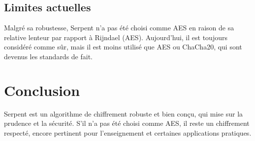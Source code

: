 \documentclass[12pt,a4paper]{report}
\begin{document}
\subsection{Limites actuelles}

Malgré sa robustesse, Serpent n’a pas été choisi comme AES en raison de sa relative lenteur par rapport à Rijndael (AES).  
Aujourd’hui, il est toujours considéré comme sûr, mais il est moins utilisé que AES ou ChaCha20, qui sont devenus les standards de fait.

\section*{Conclusion}

Serpent est un algorithme de chiffrement robuste et bien conçu, qui mise sur la prudence et la sécurité.  
S’il n’a pas été choisi comme AES, il reste un chiffrement respecté, encore pertinent pour l’enseignement et certaines applications pratiques.
\end{document}
